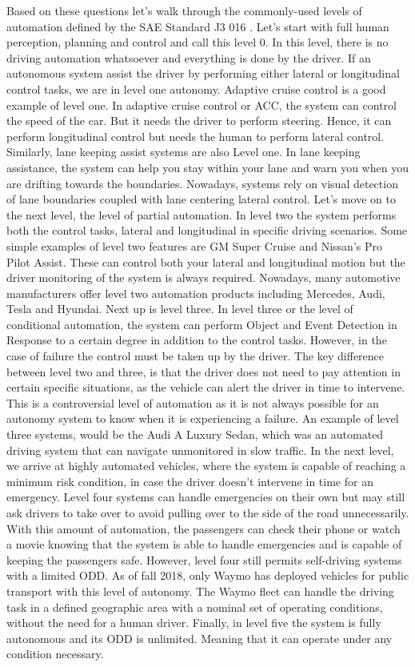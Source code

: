 Based on these questions let's walk through the commonly-used levels of automation defined by the SAE Standard J3 016 \cite{SAE2016}. 
Let's start with full human perception, planning and control and call this level 0. In this level, there is no driving automation whatsoever and everything is done by the driver. 
If an autonomous system assist the driver by performing either lateral or longitudinal control tasks, we are in level one autonomy. Adaptive cruise control is a good example of level one. 
In adaptive cruise control or ACC, the system can control the speed of the car. 
But it needs the driver to perform steering. Hence, it can perform longitudinal control but needs the human to perform lateral control. 
Similarly, lane keeping assist systems are also Level one. 
In lane keeping assistance, the system can help you stay within your lane and warn you when you are drifting towards the boundaries. 
Nowadays, systems rely on visual detection of lane boundaries coupled with lane centering lateral control. Let's move on to the next level, the level of partial automation. 
In level two the system performs both the control tasks, lateral and longitudinal in specific driving scenarios. Some simple examples of level two features are GM Super Cruise and Nissan's Pro Pilot Assist. These can control both your lateral and longitudinal motion but the driver monitoring of the system is always required. 
Nowadays, many automotive manufacturers offer level two automation products including Mercedes, Audi, Tesla and Hyundai. Next up is level three. In level three or the level of conditional automation, 
the system can perform Object and Event Detection in Response to a certain degree in addition to the control tasks. 
However, in the case of failure the control must be taken up by the driver. 
The key difference between level two and three, is that the driver does not need to pay attention in certain specific situations, as the vehicle can alert the driver in time to intervene. 
This is a controversial level of automation as it is not always possible for an autonomy system to know when it is experiencing a failure. 
An example of level three systems, would be the Audi A Luxury Sedan, which was an automated driving system that can navigate unmonitored in slow traffic. 
In the next level, we arrive at highly automated vehicles, where the system is capable of reaching a minimum risk condition, in case the driver doesn't intervene in time for an emergency. 
Level four systems can handle emergencies on their own but may still ask drivers to take over to avoid pulling over to the side of the road unnecessarily. 
With this amount of automation, the passengers can check their phone or watch a movie knowing that the system is able to handle emergencies and is capable of keeping the passengers safe. 
However, level four still permits self-driving systems with a limited ODD. As of fall 2018, only Waymo has deployed vehicles for public transport with this level of autonomy. The Waymo fleet can handle the driving task in a defined geographic area with a nominal set of operating conditions, without the need for a human driver. 
Finally, in level five the system is fully autonomous and its ODD is unlimited. 
Meaning that it can operate under any condition necessary. 

